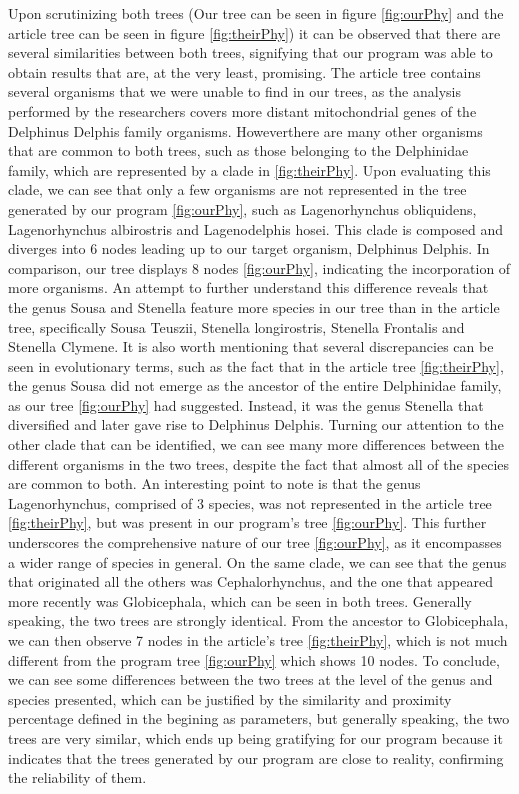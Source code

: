 \documentclass[12pt]{article}
\begin{document}
Upon scrutinizing both trees (Our tree can be seen in figure \ref{fig:ourPhy} and the article tree can be seen in figure \ref{fig:theirPhy}) it can be observed that there are several similarities between both trees, signifying that our program was able to obtain results that are, at the very least, promising. The article tree contains several organisms that we were unable to find in our trees, as the analysis performed by the researchers covers more distant mitochondrial genes of the Delphinus Delphis family organisms. Howeverthere are many other organisms that are common to both trees, such as those belonging to the Delphinidae family, which are represented by a clade in \ref{fig:theirPhy}. Upon evaluating this clade, we can see that only a few organisms are not represented in the tree generated by our program \ref{fig:ourPhy}, such as Lagenorhynchus obliquidens, Lagenorhynchus albirostris and Lagenodelphis hosei. This clade is composed and diverges into 6 nodes leading up to our target organism, Delphinus Delphis. In comparison, our tree displays 8 nodes \ref{fig:ourPhy}, indicating the incorporation of more organisms. An attempt to further understand this difference reveals that the genus Sousa and Stenella feature more species in our tree than in the article tree, specifically Sousa Teuszii, Stenella longirostris, Stenella Frontalis and Stenella Clymene.
It is also worth mentioning that several discrepancies can be seen in evolutionary terms, such as the fact that in the article tree \ref{fig:theirPhy}, the genus Sousa did not emerge as the ancestor of the entire Delphinidae family, as our tree \ref{fig:ourPhy} had suggested. Instead, it was the genus Stenella that diversified and later gave rise to Delphinus Delphis.
Turning our attention to the other clade that can be identified, we can see many more differences between the different organisms in the two trees, despite the fact that almost all of the species are common to both. An interesting point to note is that the genus Lagenorhynchus, comprised of 3 species, was not represented in the article tree \ref{fig:theirPhy}, but was present in our program's tree \ref{fig:ourPhy}. This further underscores the comprehensive nature of our tree \ref{fig:ourPhy}, as it encompasses a wider range of species in general.
On the same clade, we can see that the genus that originated all the others was Cephalorhynchus, and the one that appeared more recently was Globicephala, which can be seen in both trees. Generally speaking, the two trees are strongly identical. 
From the ancestor to Globicephala, we can then observe 7 nodes in the article's tree \ref{fig:theirPhy}, which is not much different from the program tree \ref{fig:ourPhy} which shows 10 nodes.
To conclude, we can see some differences between the two trees at the level of the genus and species presented, which can be justified by the similarity and proximity percentage defined in the begining as parameters, but generally speaking, the two trees are very similar, which ends up being gratifying for our program because it indicates that the trees generated by our program are close to reality, confirming the reliability of them.
\end{document}
